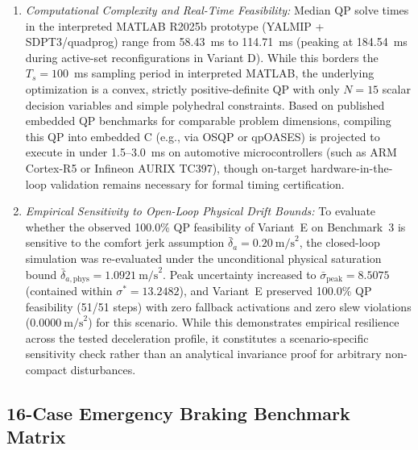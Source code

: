 \documentclass[journal]{IEEEtran}
\begin{document}
\begin{enumerate}
    \item \emph{Computational Complexity and Real-Time Feasibility:} Median QP solve times in the interpreted MATLAB R2025b prototype (YALMIP + SDPT3/quadprog) range from 58.43~ms to 114.71~ms (peaking at 184.54~ms during active-set reconfigurations in Variant D). While this borders the $T_s = 100$~ms sampling period in interpreted MATLAB, the underlying optimization is a convex, strictly positive-definite QP with only $N = 15$ scalar decision variables and simple polyhedral constraints. Based on published embedded QP benchmarks for comparable problem dimensions, compiling this QP into embedded C (e.g., via OSQP or qpOASES) is projected to execute in under 1.5--3.0~ms on automotive microcontrollers (such as ARM Cortex-R5 or Infineon AURIX TC397), though on-target hardware-in-the-loop validation remains necessary for formal timing certification.
    \item \emph{Empirical Sensitivity to Open-Loop Physical Drift Bounds:} To evaluate whether the observed 100.0\% QP feasibility of Variant~E on Benchmark~3 is sensitive to the comfort jerk assumption $\bar\delta_a = 0.20~\text{m/s}^2$, the closed-loop simulation was re-evaluated under the unconditional physical saturation bound $\bar\delta_{a,\mathrm{phys}} = 1.0921~\text{m/s}^2$. Peak uncertainty increased to $\bar\sigma_{\mathrm{peak}} = 8.5075$ (contained within $\sigma^* = 13.2482$), and Variant~E preserved 100.0\% QP feasibility (51/51 steps) with zero fallback activations and zero slew violations ($0.0000~\text{m/s}^2$) for this scenario. While this demonstrates empirical resilience across the tested deceleration profile, it constitutes a scenario-specific sensitivity check rather than an analytical invariance proof for arbitrary non-compact disturbances.
\end{enumerate}

\subsection{16-Case Emergency Braking Benchmark Matrix}
\end{document}
